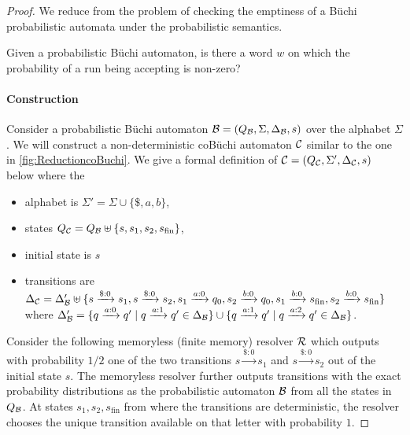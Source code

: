 \lemmaUndecidablecoBuchi*
\begin{proof}
We reduce from the problem of checking the emptiness of a B\"uchi probabilistic automata under the probabilistic semantics.

\begin{question}
    Given a probabilistic B\"uchi automaton, is there a word $w$ on which the probability of a run being accepting is non-zero?
\end{question}


\paragraph*{Construction}
Consider a probabilistic B\"uchi automaton $\mathcal{B} = (Q_{\mathcal{B}},\Sigma,\Delta_{\mathcal{B}},s)$ over the alphabet $\Sigma$. We will construct a non-deterministic coB\"uchi automaton $\mathcal{C}$ similar to the one in \cref{fig:ReductioncoBuchi}. We give a formal definition of $\mathcal{C} = (Q_{\mathcal{C}},\Sigma', \Delta_{\mathcal{C}},s)$ below where the
\begin{itemize}
    \item alphabet is $\Sigma' = \Sigma\cup \{\$,a,b\}$,
    \item states $Q_{\mathcal{C}} = Q_{\mathcal{B}}\uplus \{s, s_1, s_2, s_{\text{fin}}\}$,
    \item initial state is $s$
    \item transitions are $\Delta_{\mathcal{C}} = \Delta_{\mathcal{B}}' \uplus\{
    s\xrightarrow{\$: 0}s_1,
    s\xrightarrow{\$: 0}s_2,
    s_1\xrightarrow{a: 0}q_0,
    s_2\xrightarrow{b: 0}q_0, 
    s_1\xrightarrow{b: 0}s_{\text{fin}}, 
    s_2\xrightarrow{b: 0}s_{\text{fin}}\} $ where $\Delta_{\mathcal{B}}' = \{q \xrightarrow{a:0}q'\mid q \xrightarrow{a:1}q'\in \Delta_{\mathcal{B}} \}\cup \{q \xrightarrow{a:1}q'\mid q \xrightarrow{a:2}q'\in \Delta_{\mathcal{B}} \}$.
\end{itemize}
Consider the following memoryless (finite memory) resolver $\mathcal{R}$ which outputs with probability $1/2$ one of the two transitions $s\xrightarrow{\$: 0}s_1$ and $s\xrightarrow{\$: 0}s_2$ out of the initial state $s$. 
The memoryless resolver further outputs transitions with the exact probability distributions as the probabilistic automaton $\mathcal{B}$ from all the states in $Q_{\mathcal{B}}$. At states $s_1,s_2,s_{\text{fin}}$ from where the transitions are deterministic, the resolver chooses the unique transition available on that letter with probability $1$. 





\end{proof}
